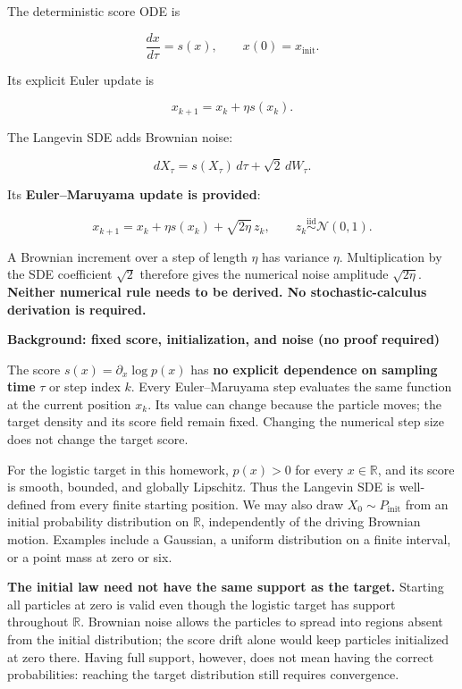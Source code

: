 \documentclass[11pt,a4paper]{article}
\begin{document}
The deterministic score ODE is

\[\frac{dx}{d\tau}=s(x),\qquad x(0)=x_{\mathrm{init}}.\]

Its explicit Euler update is

\[x_{k+1}=x_k+\eta s(x_k).\]

The Langevin SDE adds Brownian noise:

\[dX_\tau=s(X_\tau)\,d\tau+\sqrt{2}\,dW_\tau.\]

Its \textbf{Euler--Maruyama update is provided}:

\[x_{k+1}=x_k+\eta s(x_k)+\sqrt{2\eta}\,z_k,
\qquad z_k\overset{\mathrm{iid}}{\sim}\mathcal N(0,1).\]

A Brownian increment over a step of length \(\eta\) has variance
\(\eta\). Multiplication by the SDE coefficient \(\sqrt{2}\) therefore
gives the numerical noise amplitude \(\sqrt{2\eta}\). \textbf{Neither
numerical rule needs to be derived. No stochastic-calculus derivation is
required.}

\par\noindent\textbf{Background: fixed score, initialization, and noise (no proof
required)}\par\nopagebreak[4]
The score \(s(x)=\partial_x\log p(x)\) has \textbf{no explicit
dependence on sampling time} \(\tau\) or step index \(k\). Every
Euler--Maruyama step evaluates the same function at the current position
\(x_k\). Its value can change because the particle moves; the target
density and its score field remain fixed. Changing the numerical step
size does not change the target score.

For the logistic target in this homework, \(p(x)>0\) for every
\(x\in\mathbb R\), and its score is smooth, bounded, and globally
Lipschitz. Thus the Langevin SDE is well-defined from every finite
starting position. We may also draw \(X_0\sim P_{\mathrm{init}}\) from
an initial probability distribution on \(\mathbb R\), independently of
the driving Brownian motion. Examples include a Gaussian, a uniform
distribution on a finite interval, or a point mass at zero or six.

\textbf{The initial law need not have the same support as the target.}
Starting all particles at zero is valid even though the logistic target
has support throughout \(\mathbb R\). Brownian noise allows the
particles to spread into regions absent from the initial distribution;
the score drift alone would keep particles initialized at zero there.
Having full support, however, does not mean having the correct
probabilities: reaching the target distribution still requires
convergence.
\end{document}
